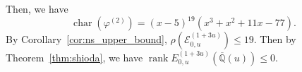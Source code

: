 \documentclass[a4paper]{jarticle} %
\theoremstyle{definition}
\theoremstyle{remark}
\DeclareMathOperator{\rank}{rank}
\DeclareMathOperator{\chara}{char}
\begin{document}
Then, we have
\begin{equation*}
    \chara(\varphi^{(2)}) = (x - 5)^{19}(x^{3} + x^{2} + 11 x - 77).
\end{equation*}
By Corollary~\ref{cor:ns_upper_bound}, $\rho(\mathcal{E}_{0,u}^{(1 + 3u)}) \leq 19$.
Then by Theorem~\ref{thm:shioda}, we have $\rank E_{0,u}^{(1 + 3u)}(\overline{\mathbb{Q}}(u)) \leq 0$.

\printbibliography
\end{document}
